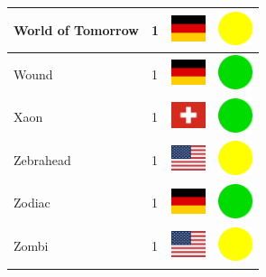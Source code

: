 \documentclass[12pt, a4paper, twoside]{report}
\begin{document}
\begin{center}
\begin{longtable}{|p{5cm}|p{2cm}|p{2cm}|p{2cm}|}
			World of Tomorrow & 1 & \includegraphics[width=1cm]{4x3/de} & \includegraphics[width=1cm]{likes/m} \\ \hline
			Wound & 1 & \includegraphics[width=1cm]{4x3/de} & \includegraphics[width=1cm]{likes/y} \\ \hline
			Xaon & 1 & \includegraphics[width=1cm]{4x3/ch} & \includegraphics[width=1cm]{likes/y} \\ \hline
			Zebrahead & 1 & \includegraphics[width=1cm]{4x3/us} & \includegraphics[width=1cm]{likes/m} \\ \hline
			Zodiac & 1 & \includegraphics[width=1cm]{4x3/de} & \includegraphics[width=1cm]{likes/y} \\ \hline
			Zombi & 1 & \includegraphics[width=1cm]{4x3/us} & \includegraphics[width=1cm]{likes/m} \\ \hline
		\end{longtable}
	\end{center}
\end{document}
